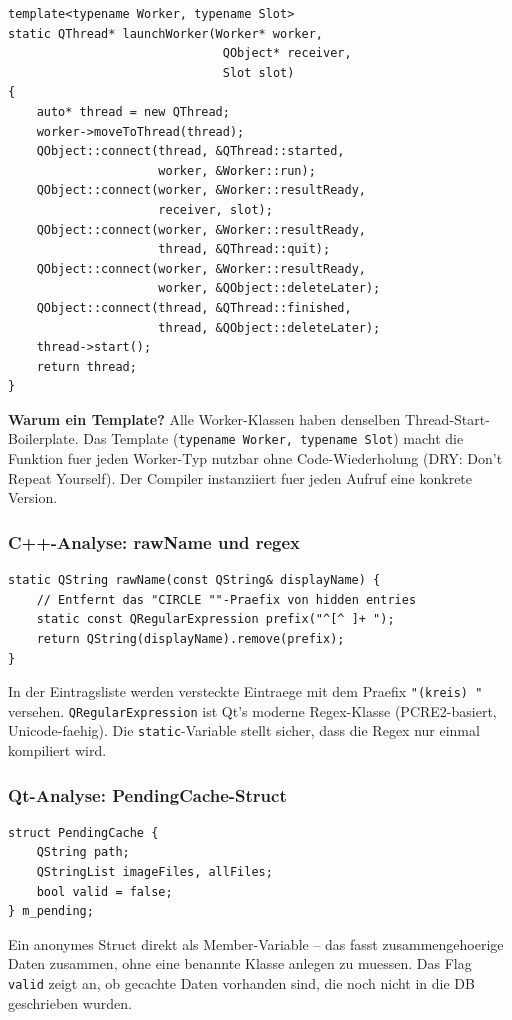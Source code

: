 \begin{lstlisting}[caption={launchWorker: generische Thread-Startfunktion}]
template<typename Worker, typename Slot>
static QThread* launchWorker(Worker* worker,
                              QObject* receiver,
                              Slot slot)
{
    auto* thread = new QThread;
    worker->moveToThread(thread);
    QObject::connect(thread, &QThread::started,
                     worker, &Worker::run);
    QObject::connect(worker, &Worker::resultReady,
                     receiver, slot);
    QObject::connect(worker, &Worker::resultReady,
                     thread, &QThread::quit);
    QObject::connect(worker, &Worker::resultReady,
                     worker, &QObject::deleteLater);
    QObject::connect(thread, &QThread::finished,
                     thread, &QObject::deleteLater);
    thread->start();
    return thread;
}
\end{lstlisting}

\textbf{Warum ein Template?} Alle Worker-Klassen haben
denselben Thread-Start-Boilerplate. Das Template
(\verb|typename Worker, typename Slot|) macht die Funktion
fuer jeden Worker-Typ nutzbar ohne Code-Wiederholung
(DRY: Don't Repeat Yourself). Der Compiler instanziiert
fuer jeden Aufruf eine konkrete Version.

\subsubsection{C++-Analyse: rawName und regex}

\begin{lstlisting}[caption={rawName: Dekorations-Praefix entfernen}]
static QString rawName(const QString& displayName) {
    // Entfernt das "CIRCLE ""-Praefix von hidden entries
    static const QRegularExpression prefix("^[^ ]+ ");
    return QString(displayName).remove(prefix);
}
\end{lstlisting}

In der Eintragsliste werden versteckte Eintraege mit
dem Praefix \verb|"(kreis) "| versehen.
\verb|QRegularExpression| ist Qt's moderne Regex-Klasse
(PCRE2-basiert, Unicode-faehig). Die \verb|static|-Variable
stellt sicher, dass die Regex nur einmal kompiliert wird.

\subsubsection{Qt-Analyse: PendingCache-Struct}

\begin{lstlisting}[style=header,
  caption={PendingCache: aggregierter Zustand}]
struct PendingCache {
    QString path;
    QStringList imageFiles, allFiles;
    bool valid = false;
} m_pending;
\end{lstlisting}

Ein anonymes Struct direkt als Member-Variable --
das fasst zusammengehoerige Daten zusammen, ohne eine
benannte Klasse anlegen zu muessen. Das Flag \verb|valid|
zeigt an, ob gecachte Daten vorhanden sind, die noch
nicht in die DB geschrieben wurden.
